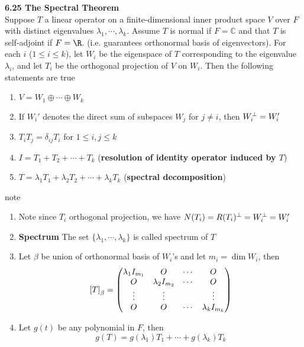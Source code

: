 \documentclass[11pt]{article}
\begin{document}
\begin{theorem*}
    \textbf{6.25 The Spectral Theorem} \\
    Suppose $T$ a linear operator  on a finite-dimensional inner product space $V$ over $F$ with distinct eigenvalues $\lambda_1, \cdots, \lambda_k$. Assume $T$ is normal if $F = \mathbb{C}$ and that $T$ is self-adjoint if $F = \R$. (i.e. guarantees orthonormal basis of eigenvectors). For each $i$ ($1\leq i \leq k$), let $W_i$ be the eigenspace of $T$ corresponding to the eigenvalue $\lambda_i$, and let $T_i$ be the orthogonal projection of $V$ on $W_i$. Then the following statements are true 
    \begin{enumerate}
        \item $V = W_1\oplus \cdots\oplus W_k$ 
        \item If $W_i'$ denotes the direct sum of subspaces $W_j$ for $j\neq i$, then $W_i^{\perp} = W_i'$
        \item $T_i T_j = \delta_{ij} T_i$ for $1\leq i,j\leq k$
        \item $I = T_1 + T_2 + \cdots + T_k$ (\textbf{resolution of identity operator induced by $T$})
        \item $T = \lambda_1 T_1 + \lambda_2 T_2 + \cdots + \lambda_k T_k$ (\textbf{spectral decomposition})
    \end{enumerate}
    note 
    \begin{enumerate}
        \item Note since $T_i$ orthogonal projection, we have $N(T_i) = R(T_i)^{\perp} = W_i^{\perp} = W_i'$
        \item \textbf{Spectrum} The set $\{\lambda_1, \cdots, \lambda_k\}$ is called spectrum of $T$
        \item Let $\beta$ be union of orthonormal basis of $W_i$'s and let $m_i = \dim{W_i}$, then 
        \[
            \left[ T \right]_{\beta} = 
            \begin{pmatrix}
                \lambda_1 I_{m_1} & O & \cdots & O \\ 
                O & \lambda_2 I_{m_2} & \cdots & O \\
                \vdots & \vdots & & \vdots \\
                O & O & \cdots & \lambda_k I_{m_k} \\
            \end{pmatrix}    
        \]
        \item Let $g(t)$ be any polynomial in $F$, then
        \[
            g(T) = g(\lambda_1) T_1 + \cdots + g(\lambda_k) T_k    
        \]
    \end{enumerate}
\end{theorem*}
\end{document}
